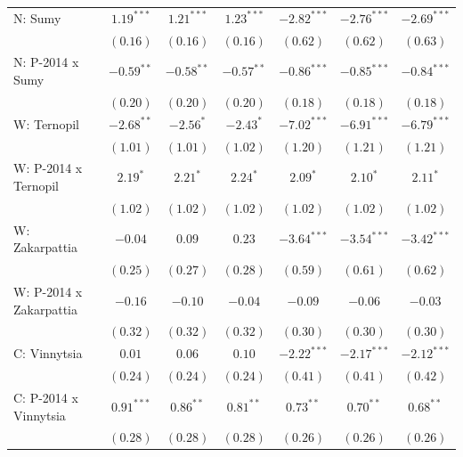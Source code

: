 \begin{table}
\begin{center}
\begin{small}
\begin{tabular}{l c c c c c c}
N: Sumy                     & $1.19^{***}$  & $1.21^{***}$  & $1.23^{***}$   & $-2.82^{***}$ & $-2.76^{***}$ & $-2.69^{***}$ \\
                            & $(0.16)$      & $(0.16)$      & $(0.16)$       & $(0.62)$      & $(0.62)$      & $(0.63)$      \\
N: P-2014 x Sumy            & $-0.59^{**}$  & $-0.58^{**}$  & $-0.57^{**}$   & $-0.86^{***}$ & $-0.85^{***}$ & $-0.84^{***}$ \\
                            & $(0.20)$      & $(0.20)$      & $(0.20)$       & $(0.18)$      & $(0.18)$      & $(0.18)$      \\
W: Ternopil                 & $-2.68^{**}$  & $-2.56^{*}$   & $-2.43^{*}$    & $-7.02^{***}$ & $-6.91^{***}$ & $-6.79^{***}$ \\
                            & $(1.01)$      & $(1.01)$      & $(1.02)$       & $(1.20)$      & $(1.21)$      & $(1.21)$      \\
W: P-2014 x Ternopil        & $2.19^{*}$    & $2.21^{*}$    & $2.24^{*}$     & $2.09^{*}$    & $2.10^{*}$    & $2.11^{*}$    \\
                            & $(1.02)$      & $(1.02)$      & $(1.02)$       & $(1.02)$      & $(1.02)$      & $(1.02)$      \\
W: Zakarpattia              & $-0.04$       & $0.09$        & $0.23$         & $-3.64^{***}$ & $-3.54^{***}$ & $-3.42^{***}$ \\
                            & $(0.25)$      & $(0.27)$      & $(0.28)$       & $(0.59)$      & $(0.61)$      & $(0.62)$      \\
W: P-2014 x Zakarpattia     & $-0.16$       & $-0.10$       & $-0.04$        & $-0.09$       & $-0.06$       & $-0.03$       \\
                            & $(0.32)$      & $(0.32)$      & $(0.32)$       & $(0.30)$      & $(0.30)$      & $(0.30)$      \\
C: Vinnytsia                & $0.01$        & $0.06$        & $0.10$         & $-2.22^{***}$ & $-2.17^{***}$ & $-2.12^{***}$ \\
                            & $(0.24)$      & $(0.24)$      & $(0.24)$       & $(0.41)$      & $(0.41)$      & $(0.42)$      \\
C: P-2014 x Vinnytsia       & $0.91^{***}$  & $0.86^{**}$   & $0.81^{**}$    & $0.73^{**}$   & $0.70^{**}$   & $0.68^{**}$   \\
                            & $(0.28)$      & $(0.28)$      & $(0.28)$       & $(0.26)$      & $(0.26)$      & $(0.26)$      \\

\end{tabular}
\end{small}
\end{center}
\end{table}
